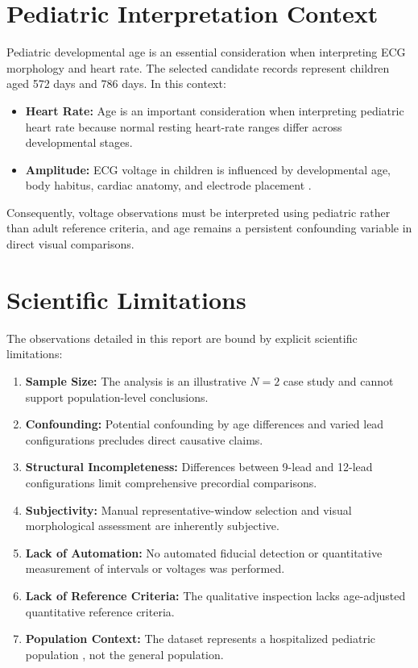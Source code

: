 \documentclass[11pt, a4paper]{article}
\begin{document}
\section{Pediatric Interpretation Context}
Pediatric developmental age is an essential consideration when interpreting ECG morphology and heart rate. The selected candidate records represent children aged 572 days and 786 days. In this context:
\begin{itemize}
    \item \textbf{Heart Rate:} Age is an important consideration when interpreting pediatric heart rate because normal resting heart-rate ranges differ across developmental stages.
    \item \textbf{Amplitude:} ECG voltage in children is influenced by developmental age, body habitus, cardiac anatomy, and electrode placement \cite{Tan2025}. 
\end{itemize}
Consequently, voltage observations must be interpreted using pediatric rather than adult reference criteria, and age remains a persistent confounding variable in direct visual comparisons.

\section{Scientific Limitations}
The observations detailed in this report are bound by explicit scientific limitations:
\begin{enumerate}
    \item \textbf{Sample Size:} The analysis is an illustrative $N=2$ case study and cannot support population-level conclusions.
    \item \textbf{Confounding:} Potential confounding by age differences and varied lead configurations precludes direct causative claims.
    \item \textbf{Structural Incompleteness:} Differences between 9-lead and 12-lead configurations limit comprehensive precordial comparisons.
    \item \textbf{Subjectivity:} Manual representative-window selection and visual morphological assessment are inherently subjective.
    \item \textbf{Lack of Automation:} No automated fiducial detection or quantitative measurement of intervals or voltages was performed.
    \item \textbf{Lack of Reference Criteria:} The qualitative inspection lacks age-adjusted quantitative reference criteria.
    \item \textbf{Population Context:} The dataset represents a hospitalized pediatric population \cite{Tan2025}, not the general population.
\end{enumerate}
\end{document}
